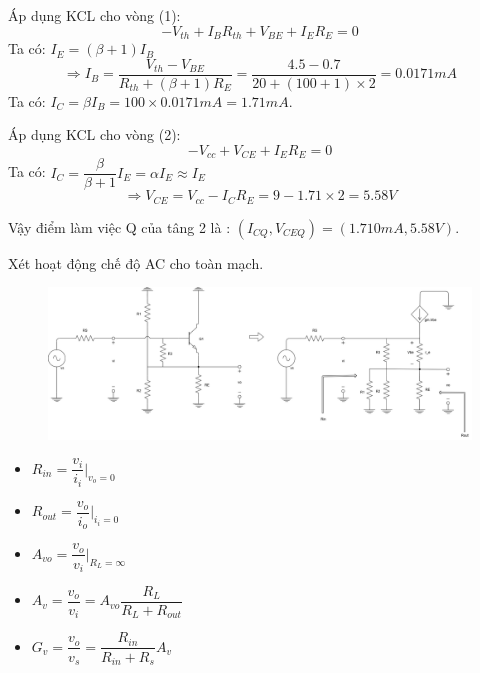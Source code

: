 Áp dụng KCL cho vòng (1):
\[ -V_{th} + I_{B}R_{th} + V_{BE} + I_{E}R_{E} = 0\]
Ta có: $ I_{E} = (\beta + 1)I_{B} $
\[\Rightarrow I_{B} = \dfrac{V_{th} - V_{BE}}{R_{th} + (\beta + 1)R_{E}} = \dfrac{4.5 - 0.7}{20 + (100+1)\times 2} = 0.0171mA\]
Ta có: $I_{C} = \beta I_{B} = 100\times 0.0171mA = 1.71mA$.

Áp dụng KCL cho vòng (2):
\[ -V_{cc} + V_{CE} + I_{E}R_{E} = 0\]
Ta có: $I_{C} = \dfrac{\beta}{\beta + 1}I_{E} = \alpha I_{E} \approx I_{E}$
\[\Rightarrow V_{CE} = V_{cc} - I_{C}R_{E} = 9 - 1.71\times 2 = 5.58V \]

Vậy điểm làm việc Q của tâng 2 là : $(I_{CQ}, V_{CEQ}) = (1.710mA, 5.58V)$.


\noindent Xét hoạt động chế độ AC cho toàn mạch.

\begin{figure}[H]
	\centering
	\includegraphics[width=.9\linewidth]{./my-chapters/my-diagrams/Question4/caub_t.png}
\end{figure}

\begin{itemize}[label =-]
	\item $R_{in} = \dfrac{v_{i}}{i_{i}}|_{v_{o} = 0}$
	\item $R_{out} = \dfrac{v_{o}}{i_{o}}|_{i_{i} = 0}$
	\item $A_{vo} = \dfrac{v_{o}}{v_{i}}|_{R_{L} = \infty}$
	\item $A_{v} = \dfrac{v_{o}}{v_{i}} = A_{vo}\dfrac{R_{L}}{R_{L} + R_{out}}$
	\item $G_{v} = \dfrac{v_{o}}{v_{s}} = \dfrac{R_{in}}{R_{in} + R_{s}} A_{v}$
\end{itemize}